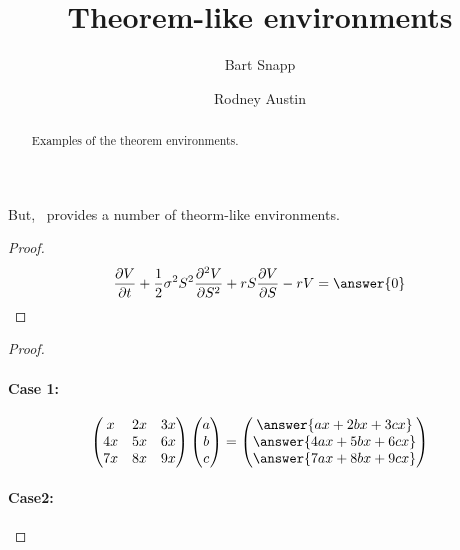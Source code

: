 \documentclass{ximera}
\author{Bart Snapp \and Rodney Austin}
\title{Theorem-like environments}
\begin{document}
\begin{abstract}
  Examples of the theorem environments.
\end{abstract}
\maketitle


But, \ximera\ provides a number of theorm-like environments.

\begin{theorem}
 \lipsum[1][1-3]
 \begin{proof}
  \lipsum[1][1-3]
\[
\frac{\partial V}{\partial t} + \frac{1}{2} \sigma^2 S^2 \frac{\partial^2 V}{\partial S^2} + r S \frac{\partial V}{\partial S} - r V = \answer{0}
\]
\lipsum[1][1-3]
 \end{proof}
\end{theorem}


\begin{theorem}[My theorem]
  \lipsum[1][1-3]
  \begin{proof}
    \lipsum[1][1-3]
    \paragraph{Case 1:}
    \lipsum[1][1-2]
    \[
\begin{pmatrix}
x & 2x & 3x \\
4x & 5x & 6x \\
7x & 8x & 9x
\end{pmatrix}
\begin{pmatrix}
a \\
b \\
c
\end{pmatrix}
=
\begin{pmatrix}
\answer{ax + 2b x+ 3cx} \\
\answer{4ax + 5bx + 6cx} \\
\answer{7a x+ 8bx + 9cx}
\end{pmatrix}
\]
\lipsum[1][1-1]
\paragraph{Case2:}
\lipsum[1][1-3]


  \end{proof}
\end{theorem}

\begin{algorithm}
  \lipsum[1][1-3]
\end{algorithm}

\begin{axiom}
  \lipsum[1][1-3]
\end{axiom}
\end{document}
